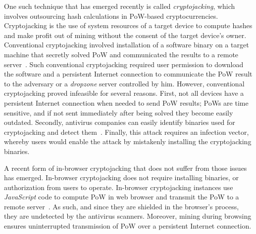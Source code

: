 \documentclass[acmlarge]{acmart}
\newcommand{\js}{{\em JavaScript}\xspace}
\newcommand{\cj}{cryptojacking\xspace}
\begin{document}
One such technique that has emerged recently is called {\em cryptojacking}, which involves outsourcing hash calculations in PoW-based cryptocurrencies. Cryptojacking is the use of system resources of a target device to compute hashes and make profit out of mining without the consent of the target device's owner. Conventional \cj involved installation of a software binary on a target machine that secretly solved PoW and communicated the results to a remote server~\cite{Scott_18}. Such conventional \cj required user permission to download the software and a persistent Internet connection to communicate the PoW result to the adversary or a {\em dropzone} server controlled by him. However, conventional \cj proved infeasible for several reasons. First, not all devices have a persistent Internet connection when needed to send PoW results; PoWs are time sensitive, and if not sent immediately after being solved they become easily outdated. Secondly, antivirus companies can easily identify binaries used for \cj and detect them~\cite{Zuckerman_18}. Finally, this attack requires an infection vector, whereby users would enable the attack by mistakenly installing the \cj binaries. 

A recent form of in-browser \cj that does not suffer from those issues has emerged. In-browser \cj does not require installing binaries, or authorization from users to operate. In-browser \cj instances use \js code to compute PoW in web browser and transmit the PoW to a remote server~\cite{Slm_18,Cimpanu_18}. As such, and since they are shielded in the browser's process, they are undetected by the antivirus scanners. Moreover, mining during browsing  ensures uninterrupted transmission of PoW over a persistent Internet connection. 
\end{document}
